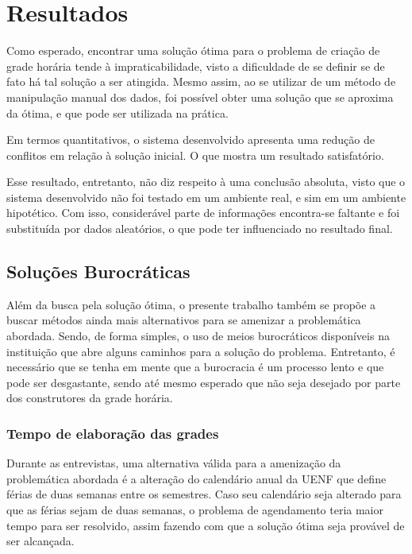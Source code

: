 \chapter{Resultados} %

Como esperado, encontrar uma solução ótima para o problema de criação de grade horária tende à impraticabilidade, visto a dificuldade de se definir se de fato há tal solução a ser atingida. Mesmo assim, ao se utilizar de um método de manipulação manual dos dados, foi possível obter uma solução que se aproxima da ótima, e que pode ser utilizada na prática.

Em termos quantitativos, o sistema desenvolvido apresenta uma redução de conflitos em relação à solução inicial. O que mostra um resultado satisfatório.


Esse resultado, entretanto, não diz respeito à uma conclusão absoluta, visto que o sistema desenvolvido não foi testado em um ambiente real, e sim em um ambiente hipotético. Com isso, considerável parte de informações encontra-se faltante e foi substituída por dados aleatórios, o que pode ter influenciado no resultado final.

\section{Soluções Burocráticas} %

Além da busca pela solução ótima, o presente trabalho também se propõe a buscar métodos ainda mais alternativos para se amenizar a problemática abordada. Sendo, de forma simples, o uso de meios burocráticos disponíveis na instituição que abre alguns caminhos para a solução do problema. Entretanto, é necessário que se tenha em mente que a burocracia é um processo lento e que pode ser desgastante, sendo até mesmo esperado que não seja desejado por parte dos construtores da grade horária.

\subsection{Tempo de elaboração das grades} %

Durante as entrevistas, uma alternativa válida para a amenização da problemática abordada é a alteração do calendário anual da UENF que define férias de duas semanas entre os semestres. Caso seu calendário seja alterado para que as férias sejam de duas semanas, o problema de agendamento teria maior tempo para ser resolvido, assim fazendo com que a solução ótima seja provável de ser alcançada.

